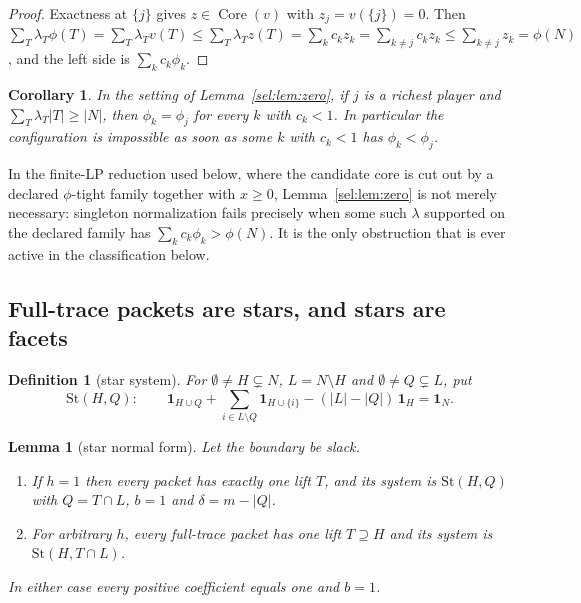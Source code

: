 \documentclass[11pt]{article}
\newtheorem{lemma}[theorem]{Lemma}
\newtheorem{corollary}[theorem]{Corollary}
\newtheorem{definition}[theorem]{Definition}
\newcommand{\core}{\operatorname{Core}}
\newcommand{\one}{\mathbf 1}
\begin{document}
\begin{proof}
Exactness at $\{j\}$ gives $z\in\core(v)$ with $z_j=v(\{j\})=0$.  Then
$\sum_T\lambda_T\phi(T)=\sum_T\lambda_Tv(T)\le\sum_T\lambda_Tz(T)
=\sum_kc_kz_k=\sum_{k\ne j}c_kz_k\le\sum_{k\ne j}z_k=\phi(N)$,
and the left side is $\sum_kc_k\phi_k$.
\end{proof}

\begin{corollary}\label{sel:cor:zero}
In the setting of Lemma~\ref{sel:lem:zero}, if $j$ is a richest player and
$\sum_T\lambda_T|T|\ge|N|$, then $\phi_k=\phi_j$
for every $k$ with $c_k<1$.  In particular the configuration is impossible as
soon as some $k$ with $c_k<1$ has $\phi_k<\phi_j$.
\end{corollary}

In the finite-LP reduction used below, where the candidate core is cut out
by a declared $\phi$-tight family together with $x\ge0$,
Lemma~\ref{sel:lem:zero} is not merely necessary: singleton normalization
fails precisely when some such $\lambda$ supported on the declared family
has $\sum_kc_k\phi_k>\phi(N)$.  It is the only obstruction that is ever
active in the classification below.

\subsection{Full-trace packets are stars, and stars are facets}

\begin{definition}[star system]\label{sel:def:star}
For $\emptyset\ne H\subsetneq N$, $L=N\setminus H$ and $\emptyset\ne
Q\subsetneq L$, put
\[
 \mathrm{St}(H,Q):\qquad
 \one_{H\cup Q}+\sum_{i\in L\setminus Q}\one_{H\cup\{i\}}
   -(|L|-|Q|)\,\one_H=\one_N .
\]
\end{definition}

\begin{lemma}[star normal form]\label{sel:lem:star}
Let the boundary be slack.
\begin{enumerate}[nosep,label=(\roman*)]
\item If $h=1$ then every packet has exactly one lift $T$, and its system is
      $\mathrm{St}(H,Q)$ with $Q=T\cap L$, $b=1$ and $\delta=m-|Q|$.
\item For arbitrary $h$, every \emph{full-trace} packet has one lift
      $T\supseteq H$ and its system is $\mathrm{St}(H,T\cap L)$.
\end{enumerate}
In either case every positive coefficient equals one and $b=1$.
\end{lemma}
\end{document}
